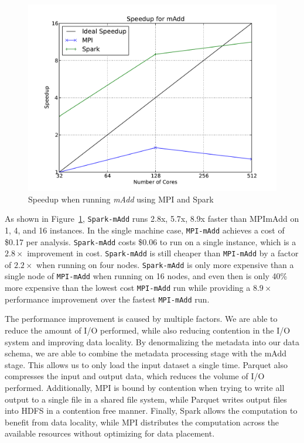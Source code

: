 \documentclass{acm_proc_article-sp}
\begin{document}
\begin{figure}[h]
\begin{center}
\includegraphics[width=0.99\linewidth]{graphs/speedup_madd.pdf}
\end{center}
\caption{Speedup when running \textit{mAdd} using MPI and Spark}
\label{fig:madd-speedup}
\end{figure}

As shown in Figure~\ref{fig:madd-speedup}, \texttt{Spark-mAdd} runs 2.8x, 5.7x, 8.9x faster than
MPImAdd on 1, 4, and 16 instances. In the single machine case, \texttt{MPI-mAdd} achieves a cost of \$0.17 per
analysis. \texttt{Spark-mAdd} costs \$0.06 to run on a single instance, which is a $2.8\times$ improvement in
cost. \texttt{Spark-mAdd} is still cheaper than \texttt{MPI-mAdd} by a factor of $2.2\times$ when running on four
nodes. \texttt{Spark-mAdd} is only more expensive than a single node of \texttt{MPI-mAdd} when running on 16
nodes, and even then is only 40\% more expensive than the lowest cost \texttt{MPI-mAdd} run while providing a
$8.9\times$ performance improvement over the fastest \texttt{MPI-mAdd} run.

The performance improvement is caused by multiple factors. We are able to reduce the amount of I/O performed,
while also reducing contention in the I/O system and improving data locality. By denormalizing the metadata into
our data schema, we are able to combine the metadata processing stage with the mAdd stage. This allows us
to only load the input dataset a single time. Parquet also compresses the input and output data, which reduces
the volume of I/O performed. Additionally, MPI is bound by contention when trying to write all output to a single
file in a shared file system, while Parquet writes output files into HDFS in a contention free manner. Finally, Spark
allows the computation to benefit from data locality, while MPI distributes the computation across the available
resources without optimizing for data placement.
\end{document}
